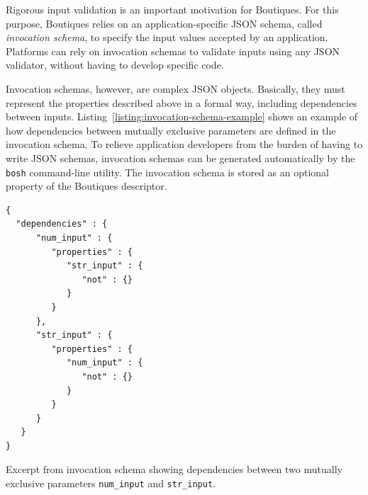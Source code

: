 \documentclass[a4paper,num-refs]{oup-contemporary}
\newcommand{\boutiques}{Boutiques\xspace}
\newcommand{\notimplementedyet}[1]{\color{blue}\emph{#1}\footnote{Still needs to be implemented}\color{black}\xspace}
\begin{document}
Rigorous input validation is an important motivation for
\boutiques. For this purpose, \boutiques relies on an
application-specific JSON schema, called \emph{invocation schema}, to
specify the input values accepted by an application. Platforms can
rely on invocation schemas to validate inputs using
any JSON validator, without having to develop specific code.

Invocation schemas, however, are complex JSON objects. Basically, they
must represent the properties described above in a formal way,
including dependencies between
inputs. Listing~\ref{listing:invocation-schema-example} shows an
example of how dependencies between mutually exclusive parameters are
defined in the invocation schema. To relieve application developers
from the burden of having to write JSON schemas, invocation
schemas can be generated automatically by the \texttt{bosh}
command-line utility. The invocation schema is stored as an optional
property of the \boutiques descriptor.


\begin{listing}
\begin{verbatim}
{
  "dependencies" : {
      "num_input" : {
         "properties" : {
            "str_input" : {
               "not" : {}
            }
         }
      },
      "str_input" : {
         "properties" : {
            "num_input" : {
               "not" : {}
            }
         }
      }
   }
}
\end{verbatim}
\caption{Excerpt from invocation schema showing dependencies between
  two mutually exclusive parameters \texttt{num\_input} and
  \texttt{str\_input}.}
\label{listing:invocation-schema-example}
\end{listing}
\end{document}
